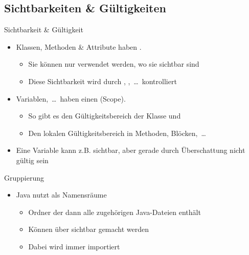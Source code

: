 \subsection{Sichtbarkeiten \& Gültigkeiten}
\begin{frame}{Sichtbarkeit \& Gültigkeit}
   \begin{itemize}[<+(1)->]
      \itemsep14pt
      \item Klassen, Methoden \& Attribute haben . \begin{itemize}
         \item Sie können nur verwendet werden, wo sie sichtbar sind
         \item Diese Sichtbarkeit wird durch , ,~\ldots\ kontrolliert
      \end{itemize}
      \item Variablen,~\ldots\ haben einen  (Scope). \begin{itemize}
         \item So gibt es den Gültigkeitsbereich der Klasse und
         \item Den lokalen Gültigkeitsbereich in Methoden, Blöcken,~\ldots
      \end{itemize}
      \item Eine Variable kann z.B. sichtbar, aber gerade durch Überschattung nicht gültig sein
   \end{itemize}
\end{frame}

\begin{frame}[c]{Gruppierung}
   \begin{itemize}[<+(1)->]
      \itemsep14pt
      \item Java nutzt  als Namensräume \begin{itemize}
         \item Ordner der dann alle zugehörigen Java-Dateien enthält
         \item Können über  sichtbar gemacht werden
         \item Dabei wird  immer importiert
      \end{itemize}
   \end{itemize}
\end{frame}


